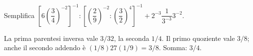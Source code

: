 
\begin{esercizio}
Semplifica $\left[6\left(\dfrac34\right)^{-2}\right]^{-1}:\left[\left(\dfrac29\right)^{-2}:\left(\dfrac32\right)^4\right]^{-1}+2^{-3}\dfrac{1}{3^{-3}}3^{-2}$.
\end{esercizio}

\begin{soluzione}
La prima parentesi inversa vale $3/32$, la seconda $1/4$. Il primo quoziente vale $3/8$; anche il secondo addendo è $(1/8)27(1/9)=3/8$. Somma: $3/4$.
\end{soluzione}

